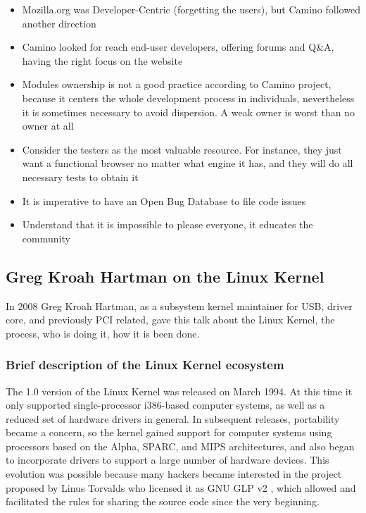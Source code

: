 \documentclass[11pt]{article} %
\begin{document}
\begin{itemize}
  	  \item Mozilla.org was Developer-Centric (forgetting the users), but Camino followed another direction
  	  \item Camino looked for reach end-user developers, offering forums and Q\&A, having the right focus on the website
  	  \item Modules ownership is not a good practice according to Camino project, because it centers the whole development process in individuals, nevertheless it is sometimes necessary to avoid dispersion. A weak owner is worst than no owner at all
  	  \item Consider the testers as the most valuable resource. For instance, they just want a functional browser no matter what engine it has, and they will do all necessary tests to obtain it
  	  \item It is imperative to have an Open Bug Database to file code issues
  	  \item Understand that it is impossible to please everyone, it educates the community
  	\end{itemize}

\subsection{Greg Kroah Hartman on the Linux Kernel}

In 2008 Greg Kroah Hartman, as a subsystem kernel maintainer for USB, driver core, and previously PCI related, gave this talk about the Linux Kernel, the process, who is doing it, how it is been done.

\subsubsection{Brief description of the Linux Kernel ecosystem}

The 1.0 version of the Linux Kernel was released on March 1994. At this time it only supported single-processor i386-based computer systems, as well as a reduced set of hardware drivers in general. In subsequent releases, portability became a concern, so the kernel gained support for computer systems using processors based on the Alpha, SPARC, and MIPS architectures, and also began to incorporate drivers to support a large number of hardware devices. This evolution was possible because many hackers became interested in the project proposed by Linus Torvalds who licensed it as GNU GLP v2 \cite{Torvalds:1991lt}, which allowed and facilitated the rules for sharing the source code since the very beginning.
\end{document}

